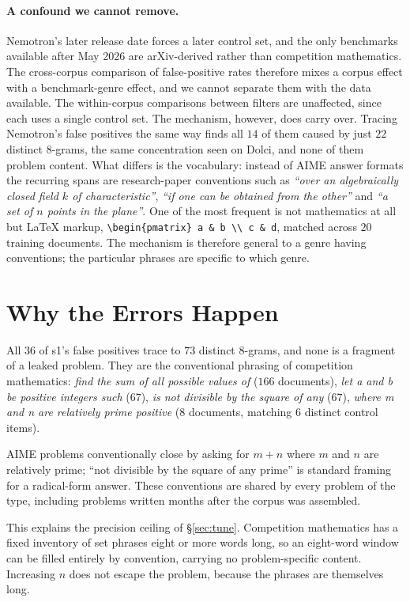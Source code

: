 \documentclass[11pt]{article}
\begin{document}
\paragraph{A confound we cannot remove.} Nemotron's later release date forces a
later control set, and the only benchmarks available after May 2026 are
arXiv-derived rather than competition mathematics. The cross-corpus comparison of
false-positive rates therefore mixes a corpus effect with a benchmark-genre
effect, and we cannot separate them with the data available. The within-corpus
comparisons between filters are unaffected, since each uses a single control set.
The mechanism, however, does carry over. Tracing Nemotron's false positives the
same way finds all $14$ of them caused by just $22$ distinct 8-grams, the same
concentration seen on Dolci, and none of them problem content. What differs is the
vocabulary: instead of AIME answer formats the recurring spans are research-paper
conventions such as \emph{``over an algebraically closed field $k$ of
characteristic''}, \emph{``if one can be obtained from the other''} and
\emph{``a set of $n$ points in the plane''}. One of the most frequent is not
mathematics at all but \LaTeX{} markup, \texttt{{\textbackslash}begin\{pmatrix\} a
\& b {\textbackslash}{\textbackslash} c \& d}, matched across $20$ training
documents. The mechanism is therefore general to a genre having conventions; the
particular phrases are specific to which genre.

\section{Why the Errors Happen}
\label{sec:why}

All $36$ of s1's false positives trace to $73$ distinct 8-grams, and none is a
fragment of a leaked problem. They are the conventional phrasing of competition
mathematics: \emph{find the sum of all possible values of} ($166$ documents),
\emph{let a and b be positive integers such} ($67$), \emph{is not divisible by the
square of any} ($67$), \emph{where m and n are relatively prime positive} ($8$
documents, matching $6$ distinct control items).

AIME problems conventionally close by asking for $m+n$ where $m$ and $n$ are
relatively prime; ``not divisible by the square of any prime'' is standard framing
for a radical-form answer. These conventions are shared by every problem of the
type, including problems written months after the corpus was assembled.

This explains the precision ceiling of \S\ref{sec:tune}. Competition mathematics
has a fixed inventory of set phrases eight or more words long, so an eight-word
window can be filled entirely by convention, carrying no problem-specific content.
Increasing $n$ does not escape the problem, because the phrases are themselves
long.
\end{document}
